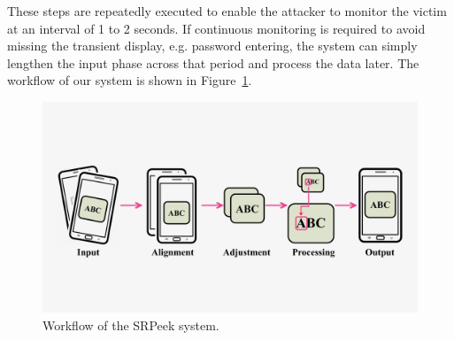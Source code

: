 These steps are repeatedly executed to enable the attacker to monitor the victim at an interval of 1 to 2 seconds. If continuous monitoring is required to avoid missing the transient display, e.g. password entering, the system can simply lengthen the input phase across that period and process the data later. The workflow of our system is shown in Figure~\ref{fig-workflow}.
\begin{figure}
  \centering
     \includegraphics[width=0.90\linewidth]{./pic/workflow_cl.pdf}
     \caption{Workflow of the \textsf{SRPeek} system.}
     \label{fig-workflow}
\end{figure}


